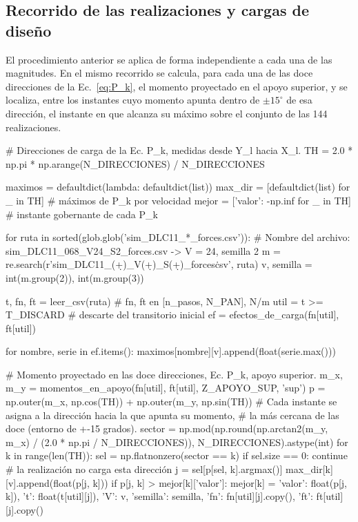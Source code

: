 \subsection*{Recorrido de las realizaciones y cargas de diseño}

El procedimiento anterior se aplica de forma independiente a cada una de las magnitudes. En el mismo recorrido se calcula, para cada una de las doce direcciones de la Ec.~\ref{eq:P_k}, el momento proyectado en el apoyo superior, y se localiza, entre los instantes cuyo momento apunta dentro de $\pm 15^\circ$ de esa dirección, el instante en que alcanza su máximo sobre el conjunto de las 144 realizaciones.

\begin{pycode}
# Direcciones de carga de la Ec. P_k, medidas desde Y_l hacia X_l.
TH = 2.0 * np.pi * np.arange(N_DIRECCIONES) / N_DIRECCIONES

maximos = defaultdict(lambda: defaultdict(list))
max_dir = [defaultdict(list) for _ in TH]      # máximos de P_k por velocidad
mejor   = [{'valor': -np.inf} for _ in TH]     # instante gobernante de cada P_k

for ruta in sorted(glob.glob('sim_DLC11_*_forces.csv')):
    # Nombre del archivo: sim_DLC11_068_V24_S2_forces.csv -> V = 24, semilla 2
    m = re.search(r'sim_DLC11_(\d+)_V(\d+)_S(\d+)_forces\.csv', ruta)
    v, semilla = int(m.group(2)), int(m.group(3))

    t, fn, ft = leer_csv(ruta)          # fn, ft en [n_pasos, N_PAN], N/m
    util = t >= T_DISCARD               # descarte del transitorio inicial
    ef = efectos_de_carga(fn[util], ft[util])

    for nombre, serie in ef.items():
        maximos[nombre][v].append(float(serie.max()))

    # Momento proyectado en las doce direcciones, Ec. P_k, apoyo superior.
    m_x, m_y = momentos_en_apoyo(fn[util], ft[util], Z_APOYO_SUP, 'sup')
    p = np.outer(m_x, np.cos(TH)) + np.outer(m_y, np.sin(TH))
    # Cada instante se asigna a la dirección hacia la que apunta su momento,
    # la más cercana de las doce (entorno de +-15 grados).
    sector = np.mod(np.round(np.arctan2(m_y, m_x) / (2.0 * np.pi / N_DIRECCIONES)),
                    N_DIRECCIONES).astype(int)
    for k in range(len(TH)):
        sel = np.flatnonzero(sector == k)
        if sel.size == 0:
            continue                    # la realización no carga esta dirección
        j = sel[p[sel, k].argmax()]
        max_dir[k][v].append(float(p[j, k]))
        if p[j, k] > mejor[k]['valor']:
            mejor[k] = {'valor': float(p[j, k]), 't': float(t[util][j]),
                        'V': v, 'semilla': semilla,
                        'fn': fn[util][j].copy(), 'ft': ft[util][j].copy()}



\end{pycode}

